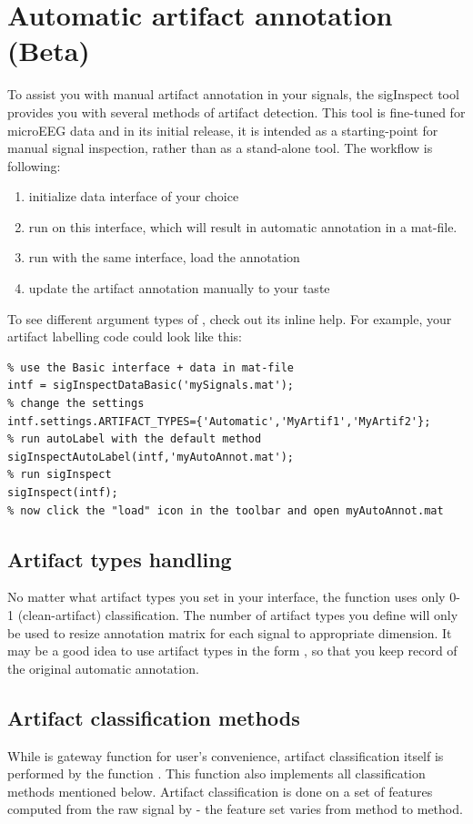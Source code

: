 \documentclass[a4paper,10pt]{article}
\begin{document}
\section{Automatic artifact annotation (Beta)}
To assist you with manual artifact annotation in your signals, the sigInspect tool provides you with several methods of artifact detection. This tool is fine-tuned for microEEG data and in its initial release, it is intended as a starting-point for manual signal inspection, rather than as a stand-alone tool. The workflow is following:
\begin{enumerate}
 \item initialize data interface of your choice 
 \item run  on this interface, which will result in automatic annotation in a mat-file.
 \item run  with the same interface, load the annotation
 \item update the artifact annotation manually to your taste
\end{enumerate}

To see different argument types of , check out its inline help. For example, your artifact labelling code could look like this:

\begin{lstlisting}
% use the Basic interface + data in mat-file
intf = sigInspectDataBasic('mySignals.mat');
% change the settings
intf.settings.ARTIFACT_TYPES={'Automatic','MyArtif1','MyArtif2'};
% run autoLabel with the default method
sigInspectAutoLabel(intf,'myAutoAnnot.mat');
% run sigInspect
sigInspect(intf);
% now click the "load" icon in the toolbar and open myAutoAnnot.mat
\end{lstlisting}

\subsection{Artifact types handling}
No matter what artifact types you set in your interface, the   function uses only 0-1 (clean-artifact) classification. The number of artifact types you define will only be used to resize annotation matrix for each signal to appropriate dimension. It may be a good idea to use artifact types in the form , so that you keep record of the original automatic annotation.

\subsection{Artifact classification methods}
While  is gateway function for user's convenience, artifact classification itself is performed by the function  . This function also implements all classification methods mentioned below. Artifact classification is done on a set of features computed from the raw signal by  - the feature set varies from method to method.
\end{document}

